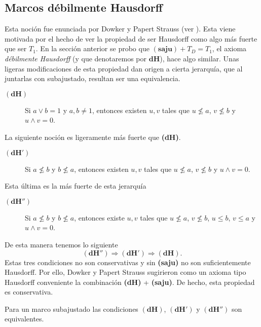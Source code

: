 \documentclass{comunicaciones}
\begin{document}
\subsection{Marcos débilmente Hausdorff}

Esta noción fue enunciada por Dowker y Papert Strauss (ver \cite{D.P.}). Esta viene motivada por el hecho de ver la propiedad de ser Hausdorff como algo más fuerte que ser $T_1$. En la sección anterior se probo que $\mathbf{(saju)}+T_D=T_1$, el axioma \emph{débilmente Hausdorff} (y que denotaremos por $\mathbf{dH}$), hace algo similar. Unas ligeras modificaciones de esta propiedad dan origen a cierta jerarquía, que al juntarlas con subajustado, resultan ser una equivalencia.\\

\begin{description}
    \item[$\mathbf{(dH)}$] Si $a\vee b=1$ y $a, b\neq 1$, entonces existen $u, v$ tales que $u\nleq a$, $v\nleq b$ y $u\wedge v=0$. 
\end{description}

La siguiente noción es ligeramente más fuerte que \textbf{(dH)}.

\begin{description}
    \item[$\mathbf{(dH')}$] Si $a\nleq b$ y $b\nleq a$, entonces existen $u, v$ tales que $u\nleq a$, $v\nleq b$ y $u\wedge v=0$. 
\end{description}

Esta última es la más fuerte de esta jerarquía

\begin{description}
    \item[$\mathbf{(dH'')}$] Si $a\nleq b$ y $b\nleq a$, entonces existe $u, v$ tales que $u\nleq a$, $v\nleq b$, $u\leq b$, $v\leq a$ y $u\wedge v=0$.  
\end{description}

De esta manera tenemos lo siguiente
\[
\mathbf{(dH'')}\Rightarrow \mathbf{(dH')}\Rightarrow \mathbf{(dH)}.
\]
Estas tres condiciones no son conservativas y sin \textbf{(saju)} no son suficientemente Hausdorff. Por ello, Dowker y Papert Strauss sugirieron como un axioma tipo Hausdorff conveniente la combinación \textbf{(dH)} + \textbf{(saju)}. De hecho, esta propiedad es conservativa. 

\begin{prop}\label{Proposicion2.3.1}
    Para un marco subajustado las condiciones $\mathbf{(dH)}$, $\mathbf{(dH')}$ y $\mathbf{(dH'')}$ son equivalentes.
\end{prop}
\end{document}
